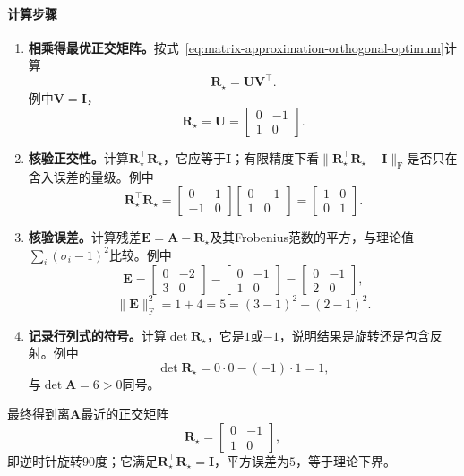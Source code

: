 \paragraph{计算步骤}
\begin{enumerate}
 \item \textbf{相乘得最优正交矩阵。}按式~\eqref{eq:matrix-approximation-orthogonal-optimum}计算
 \[
  \bm R_\star=\bm U\bm V^\top .
 \]
 例中$\bm V=\bm I$，
 \[
  \bm R_\star=\bm U=\begin{bmatrix}0&-1\\1&0\end{bmatrix}.
 \]

 \item \textbf{核验正交性。}计算$\bm R_\star^\top\bm R_\star$，它应等于$\bm I$；有限精度下看$\lVert\bm R_\star^\top\bm R_\star-\bm I\rVert_{\mathrm F}$是否只在舍入误差的量级。例中
 \[
  \bm R_\star^\top\bm R_\star
  =\begin{bmatrix}0&1\\-1&0\end{bmatrix}\begin{bmatrix}0&-1\\1&0\end{bmatrix}
  =\begin{bmatrix}1&0\\0&1\end{bmatrix}.
 \]

 \item \textbf{核验误差。}计算残差$\bm E=\bm A-\bm R_\star$及其Frobenius范数的平方，与理论值$\sum_i(\sigma_i-1)^2$比较。例中
 \[
  \bm E=\begin{bmatrix}0&-2\\3&0\end{bmatrix}-\begin{bmatrix}0&-1\\1&0\end{bmatrix}=\begin{bmatrix}0&-1\\2&0\end{bmatrix},
 \]
 \[
  \lVert\bm E\rVert_{\mathrm F}^2=1+4=5=(3-1)^2+(2-1)^2 .
 \]

 \item \textbf{记录行列式的符号。}计算$\det\bm R_\star$，它是$1$或$-1$，说明结果是旋转还是包含反射。例中
 \[
  \det\bm R_\star=0\cdot0-(-1)\cdot1=1 ,
 \]
 与$\det\bm A=6>0$同号。
\end{enumerate}

最终得到离$\bm A$最近的正交矩阵
\[
 \bm R_\star=\begin{bmatrix}0&-1\\1&0\end{bmatrix},
\]
即逆时针旋转$90$度；它满足$\bm R_\star^\top\bm R_\star=\bm I$，平方误差为$5$，等于理论下界。

